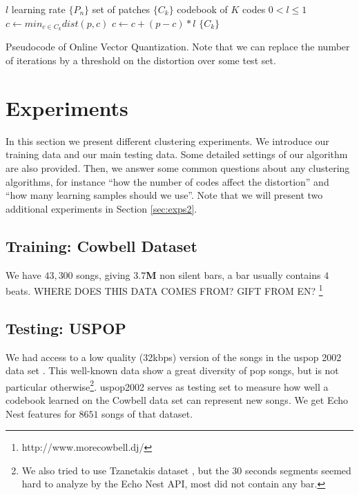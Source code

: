 \documentclass{article}
\begin{document}
\begin{algorithm}
\begin{algorithmic}
\STATE$l$ learning rate
\STATE$\{P_n\}$ set of patches
\STATE$\{C_k\}$ codebook of $K$ codes
\REQUIRE $0 < l \leq 1$
\STATE$c \leftarrow min_{c \in C_k} dist(p,c)$
\STATE$c \leftarrow c + (p - c) * l$
\ENDFOR
\ENDFOR
\RETURN $\{C_k\}$
\caption{\small{Pseudocode of Online Vector Quantization. Note that we can 
replace the number of iterations by a threshold on the distortion over some 
test set.}
\label{algo:vq}}
\end{algorithmic}
\end{algorithm}



\section{Experiments}\label{sec:experiments}
In this section we present different clustering experiments. We introduce
our training data and our main testing data. Some detailed settings
of our algorithm are also provided. Then, we answer some common questions
about any clustering algorithms, for instance 
``how the number of codes affect the distortion''
and ``how many learning samples should we use''.
Note that we will present two additional experiments in 
Section \ref{sec:exps2}.


\subsection{Training: Cowbell Dataset}\label{sec:traindata}
We have $43,300$ songs, giving  
$\mathbf{3.7}$\textbf{M} 
non silent bars, a bar usually 
contains $4$ beats. WHERE DOES THIS DATA COMES FROM? GIFT FROM EN?
\footnote{http://www.morecowbell.dj/}

\subsection{Testing: USPOP}\label{sec:testdata}
We had access to a low quality (32kbps) version of the songs in the uspop 2002 
data set \cite{uspop2002}.
This well-known data show a great diversity of pop songs, but is not particular
otherwise\footnote{We 
also tried to use Tzanetakis dataset \cite{Tzanetakis2002a}, but 
the $30$ seconds segments seemed hard to analyze by the Echo Nest API, most did
not contain any bar.}.
uspop2002 serves as testing set to measure how well a codebook learned on
the Cowbell data set can represent new songs. We get Echo Nest features
for $8651$ songs of that dataset.
\end{document}
